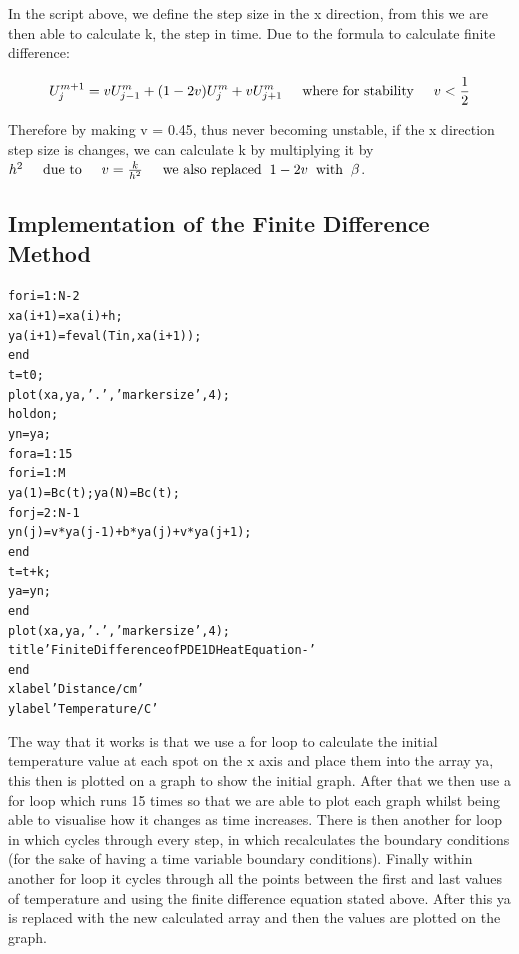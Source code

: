\documentclass[11pt,a4paper]{article}
\begin{document}
In the script above, we define the step size in the x direction, from this we are then able to calculate k, the step in time. Due to the formula to calculate finite difference:

\[U^{m+1}_j = vU^m_{j-1} +(1-2v)U^m_{j}+vU^m_{j+1} \hspace{5mm} \text{where for stability} \hspace{5mm} v < \frac{1}{2}\]

Therefore by making v = 0.45, thus never becoming unstable, if the x direction step size is changes, we can calculate k by multiplying it by $h^2 \hspace{5mm} \text{due to} \hspace{5mm} v = \frac{k}{h^2} \hspace{5mm} \text{we also replaced} \hspace{2mm} 1-2v \hspace{2mm} \text{with} \hspace{2mm} \beta $.

\subsection{Implementation of the Finite Difference Method}

\begin{alltt}
for i = 1:N-2
    xa(i+1) = xa(i) + h; %
    ya(i+1) = feval(Tin, xa(i+1)); %
end
t = t0; %
plot(xa, ya, '.', 'markersize', 4); %
hold on; %
yn = ya; %
for a = 1:15 %
    for i = 1:M %
        ya(1) = Bc(t); ya(N) = Bc(t); %
	       for j = 2:N-1 %
           yn(j) = v*ya(j-1) + b*ya(j) + v*ya(j+1);
	       end
        t = t+k; %
        ya = yn; %
    end
    plot(xa, ya, '.', 'markersize', 4); %
    title 'Finite Difference of PDE 1D Heat Equation - '
end
xlabel 'Distance/cm'
ylabel 'Temperature/C'
\end{alltt}

The way that it works is that we use a for loop to calculate the initial temperature value at each spot on the x axis and place them into the array ya, this then is plotted on a graph to show the initial graph. After that we then use a for loop which runs 15 times so that we are able to plot each graph whilst being able to visualise how it changes as time increases. There is then another for loop in which cycles through every step, in which recalculates the boundary conditions (for the sake of having a time variable boundary conditions). Finally within another for loop it cycles through all the points between the first and last values of temperature and using the finite difference equation stated above. After this ya is replaced with the new calculated array and then the values are plotted on the graph.
\end{document}
